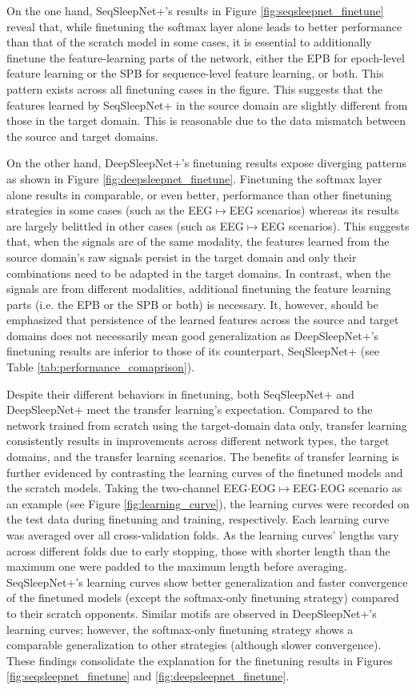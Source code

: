 \documentclass[journal,twoside,web]{ieeecolor}
\begin{document}
On the one hand, SeqSleepNet+'s results in Figure \ref{fig:seqsleepnet_finetune} reveal that, while finetuning the softmax layer alone leads to better performance than that of the scratch model in some cases, it is essential to additionally finetune the feature-learning parts of the network, either the EPB for epoch-level feature learning or the SPB for sequence-level feature learning, or both. This pattern exists across all finetuning cases in the figure. This suggests that the features learned by SeqSleepNet+ in the source domain are slightly different from those in the target domain. This is reasonable due to the data mismatch between the source and target domains.

On the other hand, DeepSleepNet+'s finetuning results expose diverging patterns as shown in Figure \ref{fig:deepsleepnet_finetune}. Finetuning the softmax layer alone results in comparable, or even better, performance than other finetuning strategies in some cases (such as the EEG$\mapsto$EEG scenarios) whereas its results are largely belittled in other cases (such as EEG$\mapsto$EEG scenarios). This suggests that, when the signals are of the same modality, the features learned from the source domain's raw signals persist in the target domain and only their combinations need to be adapted in the target domains. In contrast, when the signals are from different modalities, additional finetuning the feature learning parts (i.e. the EPB or the SPB or both) is necessary. It, however, should be emphasized that persistence of the learned features across the source and target domains does not necessarily mean good generalization as DeepSleepNet+'s finetuning results are inferior to those of its counterpart, SeqSleepNet+ (see Table \ref{tab:performance_comaprison}).


Despite their different behaviors in finetuning, both SeqSleepNet+ and DeepSleepNet+ meet the transfer learning's expectation. Compared to the network trained from scratch using the target-domain data only, transfer learning consistently results in improvements across different network types, the target domains, and the transfer learning scenarios. The benefits of transfer learning is further evidenced by contrasting the learning curves of the finetuned models and the scratch models. Taking the two-channel EEG$\cdot$EOG$\mapsto$EEG$\cdot$EOG scenario as an example (see Figure \ref{fig:learning_curve}), the learning curves were recorded on the test data during finetuning and training, respectively. Each learning curve was averaged over all cross-validation folds. As the learning curves' lengths vary across different folds due to early stopping, those with shorter length than the maximum one were padded to the maximum length before averaging. SeqSleepNet+'s learning curves show better generalization and faster convergence of the finetuned models (except the softmax-only finetuning strategy) compared to their scratch opponents. Similar motifs are observed in DeepSleepNet+'s learning curves; however, the softmax-only finetuning strategy shows a comparable generalization to other strategies (although slower convergence). These findings consolidate the explanation for the finetuning results in Figures \ref{fig:seqsleepnet_finetune} and \ref{fig:deepsleepnet_finetune}.
\end{document}
